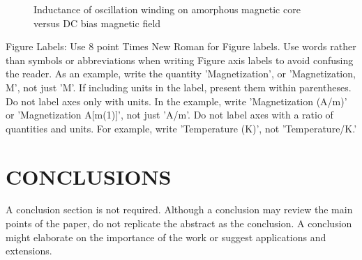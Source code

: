 \documentclass[letterpaper, 10 pt, conference]{ieeeconf}  %
\begin{document}
   \begin{figure}[thpb]
      \centering
      \caption{Inductance of oscillation winding on amorphous
       magnetic core versus DC bias magnetic field}
      \label{figurelabel}
   \end{figure}
   

Figure Labels: Use 8 point Times New Roman for Figure labels. Use words rather than symbols or abbreviations when writing Figure axis labels to avoid confusing the reader. As an example, write the quantity 'Magnetization', or 'Magnetization, M', not just 'M'. If including units in the label, present them within parentheses. Do not label axes only with units. In the example, write 'Magnetization (A/m)' or 'Magnetization {A[m(1)]}', not just 'A/m'. Do not label axes with a ratio of quantities and units. For example, write 'Temperature (K)', not 'Temperature/K.'

\section{CONCLUSIONS}

A conclusion section is not required. Although a conclusion may review the main points of the paper, do not replicate the abstract as the conclusion. A conclusion might elaborate on the importance of the work or suggest applications and extensions. 

\addtolength{\textheight}{-12cm}   %




\end{document}
